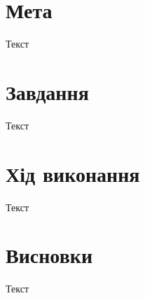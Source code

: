 \section{Мета}
Текст


\section{Завдання}
Текст


\section{Хід виконання}
Текст


\section{Висновки}
Текст
